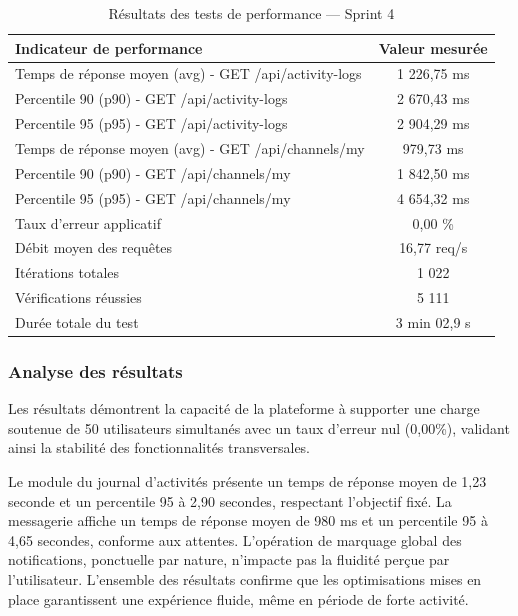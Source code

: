 \begin{table}[H]
\centering
\renewcommand{\arraystretch}{1.3}
\small
\begin{tabular}{|l|c|}
\hline
\textbf{Indicateur de performance} & \textbf{Valeur mesurée} \\
\hline
Temps de réponse moyen (avg) - GET /api/activity-logs & 1 226,75 ms \\
\hline
Percentile 90 (p90) - GET /api/activity-logs & 2 670,43 ms \\
\hline
Percentile 95 (p95) - GET /api/activity-logs & 2 904,29 ms \\
\hline
Temps de réponse moyen (avg) - GET /api/channels/my & 979,73 ms \\
\hline
Percentile 90 (p90) - GET /api/channels/my & 1 842,50 ms \\
\hline
Percentile 95 (p95) - GET /api/channels/my & 4 654,32 ms \\
\hline
Taux d'erreur applicatif & 0,00 \% \\
\hline
Débit moyen des requêtes & 16,77 req/s \\
\hline
Itérations totales & 1 022 \\
\hline
Vérifications réussies & 5 111 \\
\hline
Durée totale du test & 3 min 02,9 s \\
\hline
\end{tabular}
\caption{Résultats des tests de performance — Sprint 4}
\label{tab:perf_sprint4}
\end{table}

\subsubsection{Analyse des résultats}

Les résultats démontrent la capacité de la plateforme à supporter une charge
soutenue de 50 utilisateurs simultanés avec un taux d'erreur nul (0,00\%),
validant ainsi la stabilité des fonctionnalités transversales.

Le module du journal d'activités présente un temps de réponse moyen de
1,23 seconde et un percentile 95 à 2,90 secondes, respectant l'objectif
fixé. La messagerie affiche un temps de réponse moyen de 980 ms et un
percentile 95 à 4,65 secondes, conforme aux attentes. L'opération de
marquage global des notifications, ponctuelle par nature, n'impacte pas
la fluidité perçue par l'utilisateur. L'ensemble des résultats confirme
que les optimisations mises en place garantissent une expérience fluide,
même en période de forte activité.


